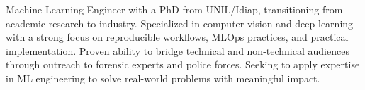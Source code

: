 


\begin{cvparagraph}
Machine Learning Engineer with a PhD from UNIL/Idiap, transitioning from academic research to industry. Specialized in computer vision and deep learning with a strong focus on reproducible workflows, MLOps practices, and practical implementation. Proven ability to bridge technical and non-technical audiences through outreach to forensic experts and police forces. Seeking to apply expertise in ML engineering to solve real-world problems with meaningful impact.
\end{cvparagraph}
